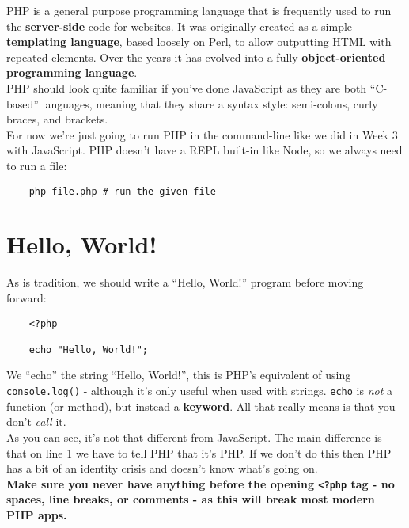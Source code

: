 PHP is a general purpose programming language that is frequently used to run the \textbf{server-side} code for websites. It was originally created as a simple \textbf{templating language}, based loosely on Perl, to allow outputting HTML with repeated elements. Over the years it has evolved into a fully \textbf{object-oriented programming language}.
\\

PHP should look quite familiar if you've done JavaScript as they are both ``C-based'' languages, meaning that they share a syntax style: semi-colons, curly braces, and brackets.
\\

For now we're just going to run PHP in the command-line like we did in Week 3 with JavaScript. PHP doesn't have a REPL built-in like Node, so we always need to run a file:

\begin{verbatim}
    php file.php # run the given file
\end{verbatim}


\section{Hello, World!}

As is tradition, we should write a ``Hello, World!'' program before moving forward:

\begin{verbatim}
    <?php

    echo "Hello, World!";
\end{verbatim}

We ``echo'' the string ``Hello, World!'', this is PHP's equivalent of using \texttt{console.log()} - although it's only useful when used with strings. \texttt{echo} is \textit{not} a function (or method), but instead a \textbf{keyword}. All that really means is that you don't \textit{call} it.
\\

As you can see, it's not that different from JavaScript. The main difference is that on line 1 we have to tell PHP that it's PHP. If we don't do this then PHP has a bit of an identity crisis and doesn't know what's going on.
\\

\textbf{Make sure you never have anything before the opening \texttt{<?php} tag - no spaces, line breaks, or comments - as this will break most modern PHP apps.}


